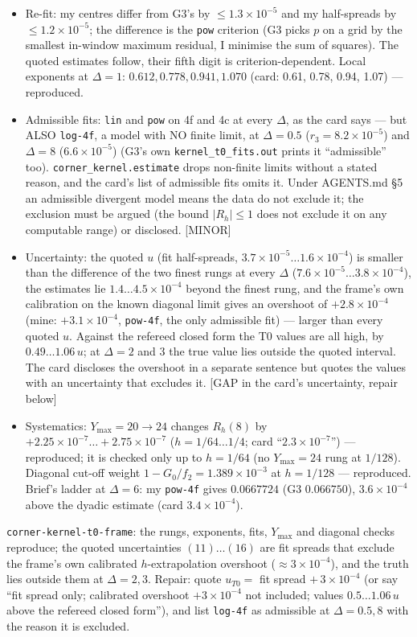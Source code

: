 \documentclass[11pt]{article}
\begin{document}
\begin{itemize}[leftmargin=*]
\item Re-fit: my centres differ from G3's by $\le1.3\times10^{-5}$ and my half-spreads by $\le1.2\times10^{-5}$; the
difference is the \texttt{pow} criterion (G3 picks $p$ on a grid by the smallest in-window maximum residual, I minimise
the sum of squares). The quoted estimates follow, their fifth digit is criterion-dependent. Local exponents at
$\Delta=1$: $0.612, 0.778, 0.941, 1.070$ (card: 0.61, 0.78, 0.94, 1.07) --- reproduced.
\item Admissible fits: \texttt{lin} and \texttt{pow} on 4f and 4c at every $\Delta$, as the card says --- but ALSO
\texttt{log-4f}, a model with NO finite limit, at $\Delta=0.5$ ($r_3=8.2\times10^{-5}$) and $\Delta=8$ ($6.6\times10^{-5}$)
(G3's own \texttt{kernel\_t0\_fits.out} prints it ``admissible'' too). \texttt{corner\_kernel.estimate} drops non-finite
limits without a stated reason, and the card's list of admissible fits omits it. Under AGENTS.md \S5 an admissible
divergent model means the data do not exclude it; the exclusion must be argued (the bound $|R_h|\le1$ does not exclude it
on any computable range) or disclosed. [MINOR]
\item Uncertainty: the quoted $u$ (fit half-spreads, $3.7\times10^{-5}\ldots1.6\times10^{-4}$) is smaller than the
difference of the two finest rungs at every $\Delta$ ($7.6\times10^{-5}\ldots3.8\times10^{-4}$), the estimates lie
$1.4\ldots4.5\times10^{-4}$ beyond the finest rung, and the frame's own calibration on the known diagonal limit gives an
overshoot of $+2.8\times10^{-4}$ (mine: $+3.1\times10^{-4}$, \texttt{pow-4f}, the only admissible fit) --- larger than every
quoted $u$. Against the refereed closed form the T0 values are all high, by $0.49\ldots1.06\,u$; at $\Delta=2$ and $3$
the true value lies outside the quoted interval. The card discloses the overshoot in a separate sentence but quotes the
values with an uncertainty that excludes it. [GAP in the card's uncertainty, repair below]
\item Systematics: $Y_{\max}=20\to24$ changes $R_h(8)$ by $+2.25\times10^{-7}\ldots+2.75\times10^{-7}$ ($h=1/64\ldots1/4$;
card ``$2.3\times10^{-7}$'') --- reproduced; it is checked only up to $h=1/64$ (no $Y_{\max}=24$ rung at $1/128$).
Diagonal cut-off weight $1-G_0/f_2=1.389\times10^{-3}$ at $h=1/128$ --- reproduced. Brief's ladder at $\Delta=6$: my
\texttt{pow-4f} gives $0.0667724$ (G3 $0.066750$), $3.6\times10^{-4}$ above the dyadic estimate (card $3.4\times10^{-4}$).
\end{itemize}
\begin{verdictgap}
\texttt{corner-kernel-t0-frame}: the rungs, exponents, fits, $Y_{\max}$ and diagonal checks reproduce; the quoted
uncertainties $(11)\ldots(16)$ are fit spreads that exclude the frame's own calibrated $h$-extrapolation overshoot
($\approx3\times10^{-4}$), and the truth lies outside them at $\Delta=2,3$. Repair: quote $u_{T0}=$ fit spread $+\,3\times10^{-4}$
(or say ``fit spread only; calibrated overshoot $+3\times10^{-4}$ not included; values $0.5\ldots1.06\,u$ above the refereed
closed form''), and list \texttt{log-4f} as admissible at $\Delta=0.5,8$ with the reason it is excluded.
\end{verdictgap}
\end{document}
